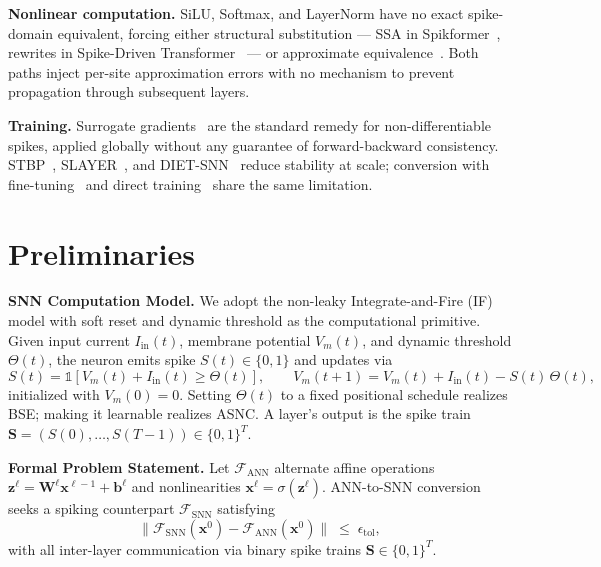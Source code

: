 \documentclass{article}
\theoremstyle{plain}
\theoremstyle{definition}
\theoremstyle{remark}
\begin{document}
\noindent\textbf{Nonlinear computation.}
SiLU, Softmax, and LayerNorm have no exact spike-domain equivalent, forcing either structural substitution — SSA in Spikformer~\citep{zhou2023spikformer}, rewrites in Spike-Driven Transformer~\citep{yao2023sdt,spikedattention2024,wang2023stsa} — or approximate equivalence~\citep{you2024spikeziptf,tang2024sorbet,zhu2023spikegpt,xing2025spikellm}. Both paths inject per-site approximation errors with no mechanism to prevent propagation through subsequent layers.

\noindent\textbf{Training.}
Surrogate gradients~\citep{neftci2019surrogate,wu2018stbp,shrestha2018slayer} are the standard remedy for non-differentiable spikes, applied globally without any guarantee of forward-backward consistency. STBP~\citep{wu2018stbp}, SLAYER~\citep{shrestha2018slayer}, and DIET-SNN~\citep{rathi2021dietsnn} reduce stability at scale; conversion with fine-tuning~\citep{rathi2020hybrid} and direct training~\citep{xing2024spikelm} share the same limitation.


\section{Preliminaries}
\label{sec:preliminaries}

\noindent\textbf{SNN Computation Model.}
We adopt the non-leaky Integrate-and-Fire (IF) model with soft reset and dynamic threshold as the computational primitive. Given input current $I_{\mathrm{in}}(t)$, membrane potential $V_m(t)$, and dynamic threshold $\Theta(t)$, the neuron emits spike $S(t) \in \{0,1\}$ and updates via
\begin{equation}
\label{eq:if_forward}
S(t) = \mathbb{1}\!\left[V_m(t) + I_{\mathrm{in}}(t) \ge \Theta(t)\right], \qquad
V_m(t{+}1) = V_m(t) + I_{\mathrm{in}}(t) - S(t)\,\Theta(t),
\end{equation}
initialized with $V_m(0) = 0$. Setting $\Theta(t)$ to a fixed positional schedule realizes BSE; making it learnable realizes ASNC. A layer's output is the spike train $\mathbf{S} = (S(0), \dots, S(T-1)) \in \{0,1\}^T$.

\noindent\textbf{Formal Problem Statement.}
Let $\mathcal{F}_{\mathrm{ANN}}$ alternate affine operations $\mathbf{z}^\ell = \mathbf{W}^\ell \mathbf{x}^{\ell-1} + \mathbf{b}^\ell$ and nonlinearities $\mathbf{x}^\ell = \sigma(\mathbf{z}^\ell)$. ANN-to-SNN conversion seeks a spiking counterpart $\mathcal{F}_{\mathrm{SNN}}$ satisfying
\begin{equation}
\label{eq:conversion_goal}
\bigl\|\mathcal{F}_{\mathrm{SNN}}(\mathbf{x}^0)
      - \mathcal{F}_{\mathrm{ANN}}(\mathbf{x}^0)\bigr\| \;\le\; \epsilon_{\mathrm{tol}},
\end{equation}
with all inter-layer communication via binary spike trains $\mathbf{S} \in \{0,1\}^T$.
\end{document}
